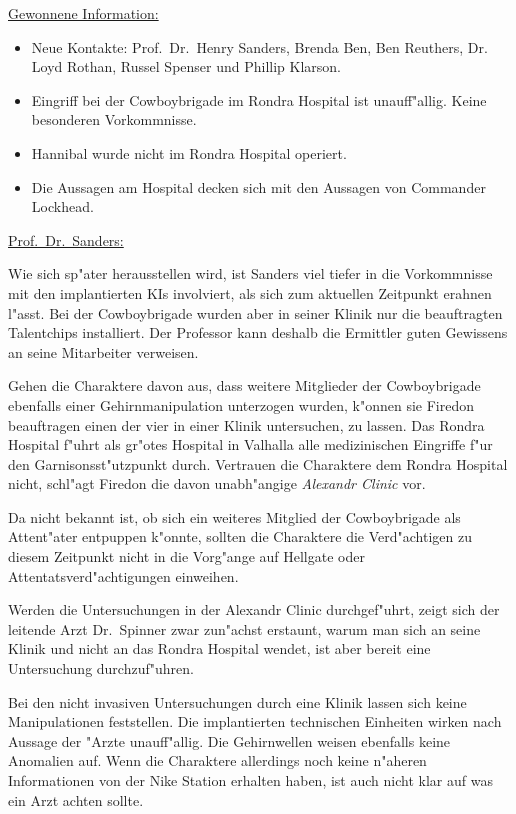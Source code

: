 \begin{remarks}
	\underline{Gewonnene Information:}
	
	\begin{itemize}
		\item Neue Kontakte: Prof.~Dr.~Henry Sanders, Brenda Ben, Ben Reuthers, Dr. Loyd Rothan, Russel Spenser und Phillip Klarson.
		\item Eingriff bei der Cowboybrigade im Rondra Hospital ist unauff"allig. Keine besonderen Vorkommnisse.
		\item Hannibal wurde nicht im Rondra Hospital operiert.
		\item Die Aussagen am Hospital decken sich mit den Aussagen von Commander Lockhead.
	\end{itemize}

	\underline{Prof.~Dr.~Sanders:}

	Wie sich sp"ater herausstellen wird, ist Sanders viel tiefer in die Vorkommnisse mit den implantierten KIs involviert, als sich zum aktuellen Zeitpunkt erahnen l"asst. Bei der Cowboybrigade wurden aber in seiner Klinik nur die beauftragten Talentchips installiert. Der Professor kann deshalb die Ermittler guten Gewissens an seine Mitarbeiter verweisen.
\end{remarks}


Gehen die Charaktere davon aus, dass weitere Mitglieder der Cowboybrigade ebenfalls einer Gehirnmanipulation unterzogen wurden, k"onnen sie Firedon beauftragen einen der vier in einer Klinik untersuchen, zu lassen. Das Rondra Hospital f"uhrt als gr"o\3tes Hospital in Valhalla alle medizinischen Eingriffe f"ur den Garnisonsst"utzpunkt durch. Vertrauen die Charaktere dem Rondra Hospital nicht, schl"agt Firedon die davon unabh"angige \emph{Alexandr Clinic} vor. 

Da nicht bekannt ist, ob sich ein weiteres Mitglied der Cowboybrigade als Attent"ater entpuppen k"onnte, sollten die Charaktere die Verd"achtigen zu diesem Zeitpunkt nicht in die Vorg"ange auf Hellgate oder Attentatsverd"achtigungen einweihen.

Werden die Untersuchungen in der Alexandr Clinic durchgef"uhrt, zeigt sich der leitende Arzt Dr.~Spinner zwar zun"achst erstaunt, warum man sich an seine Klinik und nicht an das Rondra Hospital wendet, ist aber bereit eine Untersuchung durchzuf"uhren. 

Bei den nicht invasiven Untersuchungen durch eine Klinik lassen sich keine Manipulationen feststellen. Die implantierten technischen Einheiten wirken nach Aussage der "Arzte unauff"allig. Die Gehirnwellen weisen ebenfalls keine Anomalien auf. Wenn die Charaktere allerdings noch keine n"aheren Informationen von der Nike Station erhalten haben, ist auch nicht klar auf was ein Arzt achten sollte. 

